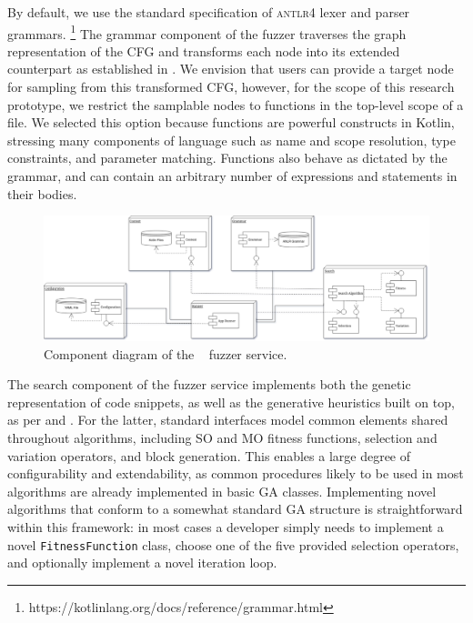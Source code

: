 By default, we use the standard specification of \textsc{antlr4}
lexer and parser grammars. \footnote{https://kotlinlang.org/docs/reference/grammar.html}
The grammar component of the fuzzer traverses the graph representation
of the \gls{CFG} and transforms each node into its extended counterpart
as established in .
We envision that users can provide a target
node for sampling from this transformed \gls{CFG},
however, for the scope of this research prototype,
we restrict the samplable nodes to functions in the top-level
scope of a file.
We selected this option because functions are powerful constructs in Kotlin,
stressing many components of language such as name and scope resolution, type constraints,
and parameter matching.
Functions also behave as dictated by the grammar, and can contain
an arbitrary number of expressions and statements in their bodies.

\begin{figure}
\includegraphics[scale=0.3]{img/components1.png}
\caption{Component diagram of the \kf~ fuzzer service.}
\label{fig:fuzzercomp}
\end{figure}

The search component of the fuzzer service implements both the genetic representation
of code snippets, as well as the generative heuristics built on top,
as per  and .
For the latter, standard interfaces model common elements
shared throughout algorithms, including 
\gls{SO} and \gls{MO} fitness functions, selection and variation operators,
and block generation.
This enables a large degree of configurability and extendability,
as common procedures likely to be used in most algorithms
are already implemented in basic \gls{GA} classes.
Implementing novel algorithms that conform to a somewhat 
standard \gls{GA} structure is straightforward within this framework:
in most cases a developer simply needs to implement a novel \texttt{FitnessFunction}
class, choose one of the five provided selection operators, and
optionally implement a novel iteration loop.

